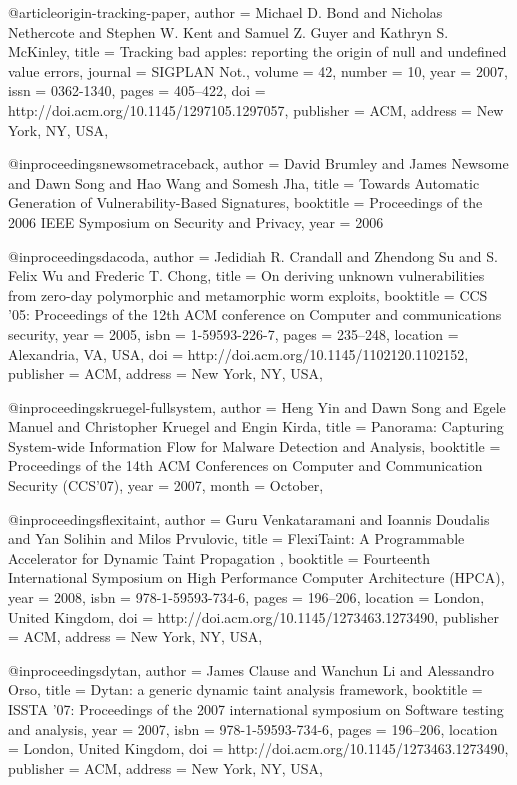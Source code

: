 @article{origin-tracking-paper,
 author = {Michael D. Bond and Nicholas Nethercote and Stephen W. Kent and Samuel Z. Guyer and Kathryn S. McKinley},
 title = {Tracking bad apples: reporting the origin of null and undefined value errors},
 journal = {SIGPLAN Not.},
 volume = {42},
 number = {10},
 year = {2007},
 issn = {0362-1340},
 pages = {405--422},
 doi = {http://doi.acm.org/10.1145/1297105.1297057},
 publisher = {ACM},
 address = {New York, NY, USA},
 }


@inproceedings{newsometraceback,
 author = {David Brumley and James Newsome and Dawn Song and Hao Wang
 and Somesh Jha},
 title = {Towards Automatic Generation of Vulnerability-Based
 Signatures},
 booktitle = {Proceedings of the 2006 {IEEE} Symposium on Security and
 Privacy},
 year = {2006}
}

@inproceedings{dacoda,
 author = {Jedidiah R. Crandall and Zhendong Su and S. Felix Wu and Frederic T. Chong},
 title = {On deriving unknown vulnerabilities from zero-day polymorphic and metamorphic worm exploits},
 booktitle = {CCS '05: Proceedings of the 12th ACM conference on Computer and communications security},
 year = {2005},
 isbn = {1-59593-226-7},
 pages = {235--248},
 location = {Alexandria, VA, USA},
 doi = {http://doi.acm.org/10.1145/1102120.1102152},
 publisher = {ACM},
 address = {New York, NY, USA},
 }

@inproceedings{kruegel-fullsystem, 
  author = {Heng Yin and Dawn Song and Egele Manuel and Christopher Kruegel and 
  Engin Kirda}, 
  title = {Panorama: Capturing System-wide Information Flow for Malware 
   Detection and Analysis}, 
  booktitle = {Proceedings of the 14th {ACM} Conferences on Computer and 
   Communication Security ({CCS'07})}, 
  year = {2007}, 
  month = {October}, 
}
 
@inproceedings{flexitaint,
 author = {Guru Venkataramani and Ioannis Doudalis and Yan Solihin and Milos Prvulovic},
 title = {FlexiTaint: A Programmable Accelerator for Dynamic Taint Propagation },
 booktitle = {Fourteenth International Symposium on High Performance Computer Architecture (HPCA)},
 year = {2008},
 isbn = {978-1-59593-734-6},
 pages = {196--206},
 location = {London, United Kingdom},
 doi = {http://doi.acm.org/10.1145/1273463.1273490},
 publisher = {ACM},
 address = {New York, NY, USA},
 }



@inproceedings{dytan,
 author = {James Clause and Wanchun Li and Alessandro Orso},
 title = {Dytan: a generic dynamic taint analysis framework},
 booktitle = {ISSTA '07: Proceedings of the 2007 international symposium on Software testing and analysis},
 year = {2007},
 isbn = {978-1-59593-734-6},
 pages = {196--206},
 location = {London, United Kingdom},
 doi = {http://doi.acm.org/10.1145/1273463.1273490},
 publisher = {ACM},
 address = {New York, NY, USA},
 }

